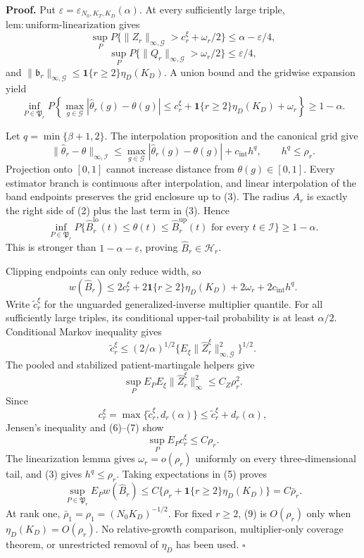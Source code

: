 \textbf{Proof.}
Put \(\varepsilon=\varepsilon_{N_0,K_T,K_D}(\alpha)\). At every sufficiently large triple, \(\mathrm{lem:uniform\mbox{-}linearization}\) gives
\[
 \sup_PP\{\|Z_r\|_{\infty,\mathcal G}>c_r^\xi+\omega_r/2\}
 \le\alpha-\varepsilon/4,
\]
\[
 \sup_PP\{\|Q_r\|_{\infty,\mathcal G}>\omega_r/2\}
 \le\varepsilon/4,                                      \tag{1}
\]
and \(\|\mathfrak b_r\|_{\infty,\mathcal G}\le\mathbf1\{r\ge2\}\eta_D(K_D)\). A union bound and the gridwise expansion yield
\[
 \inf_{P\in\mathfrak P_r}P\left\{
 \max_{g\in\mathcal G}|\widehat\theta_r(g)-\theta(g)|
 \le c_r^\xi+\mathbf1\{r\ge2\}\eta_D(K_D)+\omega_r
 \right\}\ge1-\alpha.                                  \tag{2}
\]

Let \(q=\min\{\beta+1,2\}\). The interpolation proposition and the canonical grid give
\[
 \|\widehat\theta_r-\theta\|_{\infty,\mathcal I}
 \le\max_{g\in\mathcal G}|\widehat\theta_r(g)-\theta(g)|
 +c_{\mathrm{int}}h^q,
 \qquad h^q\le\rho_r.                                   \tag{3}
\]
Projection onto \([0,1]\) cannot increase distance from \(\theta(g)\in[0,1]\). Every estimator branch is continuous after interpolation, and linear interpolation of the band endpoints preserves the grid enclosure up to (3). The radius \(A_r\) is exactly the right side of (2) plus the last term in (3). Hence
\[
 \inf_{P\in\mathfrak P_r}P\{\widehat B_r^{\mathrm{lo}}(t)
 \le\theta(t)\le\widehat B_r^{\mathrm{up}}(t)
 \text{ for every }t\in\mathcal I\}\ge1-\alpha.       \tag{4}
\]
This is stronger than \(1-\alpha-\varepsilon\), proving \(\widehat B_r\in\mathcal H_r\).

Clipping endpoints can only reduce width, so
\[
 w(\widehat B_r)
 \le2c_r^\xi+2\mathbf1\{r\ge2\}\eta_D(K_D)
 +2\omega_r+2c_{\mathrm{int}}h^q.                        \tag{5}
\]
Write \(\widetilde c_r^\xi\) for the unguarded generalized-inverse multiplier quantile. For all sufficiently large triples, its conditional upper-tail probability is at least \(\alpha/2\). Conditional Markov inequality gives
\[
 \widetilde c_r^\xi
 \le(2/\alpha)^{1/2}
 \{E_\xi\|\widehat Z_r^\xi\|_{\infty,\mathcal G}^2\}^{1/2}. \tag{6}
\]
The pooled and stabilized patient-martingale helpers give
\[
 \sup_PE_PE_\xi\|\widehat Z_r^\xi\|_\infty^2
 \le C_Z\rho_r^2.                                       \tag{7}
\]
Since
\[
 c_r^\xi=\max\{\widetilde c_r^\xi,d_r(\alpha)\}
 \le\widetilde c_r^\xi+d_r(\alpha),
\]
Jensen's inequality and (6)--(7) show
\[
 \sup_PE_Pc_r^\xi\le C\rho_r.                           \tag{8}
\]
The linearization lemma gives \(\omega_r=o(\rho_r)\) uniformly on every three-dimensional tail, and (3) gives \(h^q\le\rho_r\). Taking expectations in (5) proves
\[
 \sup_{P\in\mathfrak P_r}E_Pw(\widehat B_r)
 \le C\{\rho_r+\mathbf1\{r\ge2\}\eta_D(K_D)\}
 =C\bar\rho_r.                                           \tag{9}
\]
At rank one, \(\bar\rho_1=\rho_1=(N_0K_D)^{-1/2}\). For fixed \(r\ge2\), (9) is \(O(\rho_r)\) only when \(\eta_D(K_D)=O(\rho_r)\). No relative-growth comparison, multiplier-only coverage theorem, or unrestricted removal of \(\eta_D\) has been used. \(\square\)